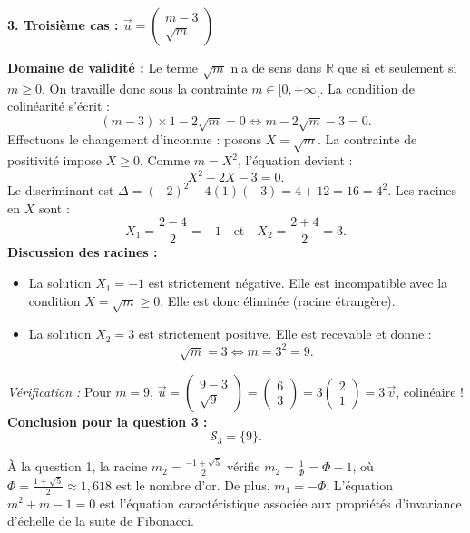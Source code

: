 \documentclass[11pt,a4paper]{article}
\newcommand{\R}{\mathbb{R}}
\begin{document}
\begin{correctionbox}
\textbf{3. Troisième cas : $\vec{u} = \begin{pmatrix} m - 3 \\ \sqrt{m} \end{pmatrix}$}

\textbf{Domaine de validité :} Le terme $\sqrt{m}$ n'a de sens dans $\R$ que si et seulement si $m \ge 0$. On travaille donc sous la contrainte $m \in [0, +\infty[$.
La condition de colinéarité s'écrit :
\[
(m - 3) \times 1 - 2\sqrt{m} = 0 \iff m - 2\sqrt{m} - 3 = 0.
\]
Effectuons le changement d'inconnue : posons $X = \sqrt{m}$. La contrainte de positivité impose $X \ge 0$. Comme $m = X^2$, l'équation devient :
\[
X^2 - 2X - 3 = 0.
\]
Le discriminant est $\Delta = (-2)^2 - 4(1)(-3) = 4 + 12 = 16 = 4^2$. Les racines en $X$ sont :
\[
X_1 = \frac{2 - 4}{2} = -1 \quad \text{et} \quad X_2 = \frac{2 + 4}{2} = 3.
\]
\textbf{Discussion des racines :}
\begin{itemize}[leftmargin=1cm]
    \item La solution $X_1 = -1$ est strictement négative. Elle est incompatible avec la condition $X = \sqrt{m} \ge 0$. Elle est donc éliminée (racine étrangère).
    \item La solution $X_2 = 3$ est strictement positive. Elle est recevable et donne :
    \[
    \sqrt{m} = 3 \iff m = 3^2 = 9.
    \]
\end{itemize}
\textit{Vérification :} Pour $m = 9$, $\vec{u} = \begin{pmatrix} 9 - 3 \\ \sqrt{9} \end{pmatrix} = \begin{pmatrix} 6 \\ 3 \end{pmatrix} = 3 \begin{pmatrix} 2 \\ 1 \end{pmatrix} = 3\,\vec{v}$, colinéaire !\\
\textbf{Conclusion pour la question 3 :}
\[
\mathcal{S}_3 = \{9\}.
\]
\end{correctionbox}

\begin{remarkbox}
À la question 1, la racine $m_2 = \frac{-1+\sqrt{5}}{2}$ vérifie $m_2 = \frac{1}{\Phi} = \Phi - 1$, où $\Phi = \frac{1+\sqrt{5}}{2} \approx 1{,}618$ est le nombre d'or. De plus, $m_1 = -\Phi$. L'équation $m^2 + m - 1 = 0$ est l'équation caractéristique associée aux propriétés d'invariance d'échelle de la suite de Fibonacci.
\end{remarkbox}
\end{document}
